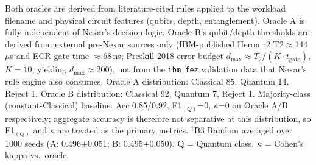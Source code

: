\begin{table}[!t]
{\footnotesize\raggedright Both oracles are derived from literature-cited rules applied to the workload filename and physical circuit features (qubits, depth, entanglement). Oracle A is fully independent of Nexar's decision logic. Oracle B's qubit/depth thresholds are derived from external pre-Nexar sources only (IBM-published Heron r2 T2$\approx$144\,$\mu$s and ECR gate time $\approx$68\,ns; Preskill 2018 error budget $d_{\max}$$\approx T_2 / (K \cdot t_\text{gate})$, $K{=}10$, yielding $d_{\max}\approx 200$), not from the \texttt{ibm\_fez} validation data that Nexar's rule engine also consumes. Oracle A distribution: Classical 85, Quantum 14, Reject 1. Oracle B distribution: Classical 92, Quantum 7, Reject 1. Majority-class (constant-Classical) baseline: Acc 0.85/0.92, F1$_{(Q)}${=}0, $\kappa${=}0 on Oracle A/B respectively; aggregate accuracy is therefore not separative at this distribution, so F1$_{(Q)}$ and $\kappa$ are treated as the primary metrics. $^{\dagger}$B3 Random averaged over 1000 seeds (A: 0.496$\pm$0.051; B: 0.495$\pm$0.050). Q = Quantum class. $\kappa$ = Cohen's kappa vs.\ oracle.\par}
\end{table}
